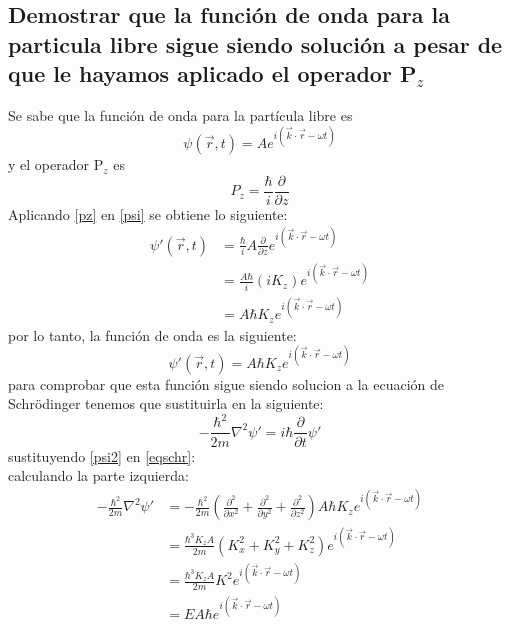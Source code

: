 \documentclass[12pt,letterpaper]{report}
\begin{document}
\subsection*{Demostrar que la función de onda para la particula libre sigue siendo solución a pesar de que le hayamos aplicado el operador P$_z$}
Se sabe que la función de onda para la partícula libre es 
\begin{equation}
    \psi(\vec{r},t)=Ae^{i(\vec{k}\cdot\vec{r}-\omega t)}
    \label{psi}
\end{equation}
y el operador P$_z$ es
\begin{equation}
    P_z= \frac{\hbar}{i} \frac{\partial}{\partial z}
    \label{pz}
\end{equation}
Aplicando \ref{pz} en \ref{psi} se obtiene lo siguiente:
\begin{align*}
\psi'(\vec{r},t)&= \frac{\hbar}{i} A  \frac{\partial}{\partial z} e^{i(\vec{k}\cdot\vec{r}-\omega t)}\\
                &=\frac{A\hbar}{i} (iK_z) e^{i(\vec{k}\cdot\vec{r}-\omega t)}\\
                &= A\hbar K_z e^{i(\vec{k}\cdot\vec{r}-\omega t)}
\end{align*}
por lo tanto, la función de onda es la siguiente:
\begin{equation}
\psi'(\vec{r},t)=A\hbar K_z e^{i(\vec{k}\cdot\vec{r}-\omega t)}
\label{psi2}
\end{equation}
para comprobar que esta función sigue siendo solucion a la ecuación de Schr\"odinger tenemos que sustituirla en la siguiente:
\begin{equation}
    -\frac{\hbar^2}{2m} \nabla^2 \psi' = i\hbar \frac{\partial}{\partial t} \psi'
    \label{eqschr}
\end{equation}
sustituyendo \ref{psi2} en \ref{eqschr}:\\
calculando la parte izquierda:
\begin{align*}
    -\frac{\hbar^2}{2m} \nabla^2 \psi'  &= -\frac{\hbar^2}{2m} \left(\frac{\partial^2}{\partial x^2} +\frac{\partial^2}{\partial y^2}+\frac{\partial^2}{\partial z^2}\right)A\hbar K_z e^{i(\vec{k}\cdot \vec{r}-\omega t)}\\
                                        &= \frac{\hbar^3 K_z A}{2m}  (K_x^2+K_y^2+K_z^2) e^{i(\vec{k}\cdot \vec{r}-\omega t)}\\
                                        &= \frac{\hbar^3 K_z A}{2m} K^2 e^{i(\vec{k}\cdot \vec{r}-\omega t)}\\
                                        &= E A\hbar e^{i(\vec{k}\cdot \vec{r}-\omega t)}\\
\end{align*}
\end{document}

